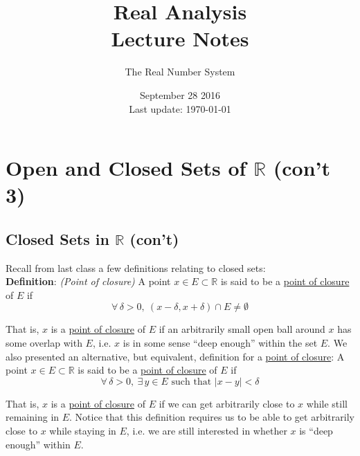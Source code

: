 \documentclass[12pt]{article}
\newlength\tindent
\renewcommand{\indent}{\hspace*{\tindent}}
\newcommand{\R}{\mathbb R}
\begin{document}
 
 
\title{Real Analysis\\Lecture Notes}
\author{The Real Number System}
\date{September 28 2016 \\ Last update: \today{}}
\maketitle

\section{Open and Closed Sets of $\bm{\R}$ (con't 3)}

\subsection{Closed Sets in $\bm{\R}$ (con't)}

Recall from last class a few definitions relating to closed sets: \\

%
%
{\bf Definition}: {\em (Point of closure)} A point $x \in E \subset \R$ is said to be a \underline{point of closure} of $E$ if
\begin{equation*}
	\forall\,\delta > 0, ~(x - \delta, x + \delta) \cap E \neq \emptyset
\end{equation*}
	
\indent That is, $x$ is a \underline{point of closure} of $E$ if an arbitrarily small open ball around $x$ has some overlap with $E$, i.e. $x$ is in some sense ``deep enough'' within the set $E$. We also presented an alternative, but equivalent, definition for a \underline{point of closure}: A point $x \in E \subset \R$ is said to be a \underline{point of closure} of $E$ if
\begin{equation*}
	\forall\,\delta > 0, ~\exists\,y\in E \text{ such that } |x - y| < \delta
\end{equation*}

\indent That is, $x$ is a \underline{point of closure} of $E$ if we can get arbitrarily close to $x$ while still remaining in $E$. Notice that this definition requires us to be able to get arbitrarily close to $x$ while staying in $E$, i.e. we are still interested in whether $x$ is ``deep enough'' within $E$. \\
\end{document}
